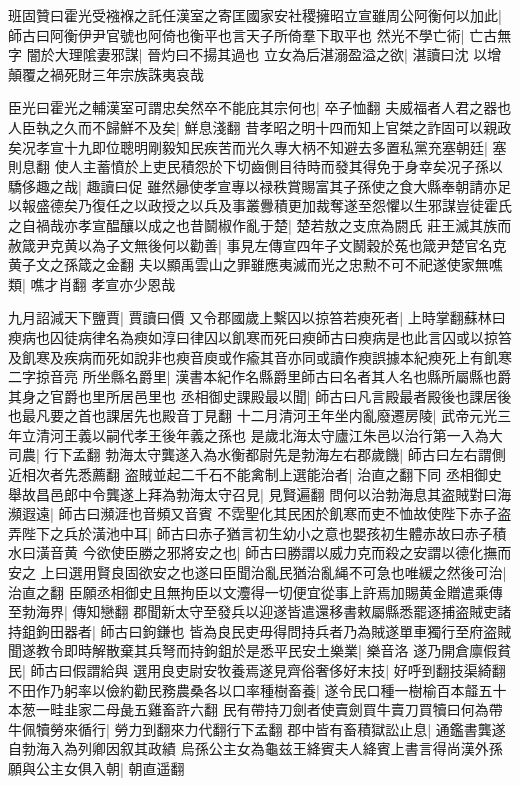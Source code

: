班固贊曰霍光受襁褓之託任漢室之寄匡國家安社稷擁昭立宣雖周公阿衡何以加此|{
	師古曰阿衡伊尹官號也阿倚也衡平也言天子所倚羣下取平也}
然光不學亡術|{
	亡古無字}
闇於大理隂妻邪謀|{
	晉灼曰不揚其過也}
立女為后湛溺盈溢之欲|{
	湛讀曰沈}
以增顛覆之禍死財三年宗族誅夷哀哉

臣光曰霍光之輔漢室可謂忠矣然卒不能庇其宗何也|{
	卒子恤翻}
夫威福者人君之器也人臣執之久而不歸鮮不及矣|{
	鮮息淺翻}
昔孝昭之明十四而知上官桀之詐固可以親政矣况孝宣十九即位聰明剛毅知民疾苦而光久專大柄不知避去多置私黨充塞朝廷|{
	塞則息翻}
使人主蓄憤於上吏民積怨於下切齒側目待時而發其得免于身幸矣况子孫以驕侈趣之哉|{
	趣讀曰促}
雖然曏使孝宣專以禄秩賞賜富其子孫使之食大縣奉朝請亦足以報盛德矣乃復任之以政授之以兵及事叢釁積更加裁奪遂至怨懼以生邪謀豈徒霍氏之自禍哉亦孝宣醖釀以成之也昔鬬椒作亂于楚|{
	楚若敖之支庶為閼氏}
莊王滅其族而赦箴尹克黄以為子文無後何以勸善|{
	事見左傳宣四年子文鬭穀於菟也箴尹楚官名克黄子文之孫箴之金翻}
夫以顯禹雲山之罪雖應夷滅而光之忠勲不可不祀遂使家無噍類|{
	噍才肖翻}
孝宣亦少恩哉

九月詔減天下鹽賈|{
	賈讀曰價}
又令郡國歲上繫囚以掠笞若瘐死者|{
	上時掌翻蘇林曰瘐病也囚徒病律名為瘐如淳曰律囚以飢寒而死曰瘐師古曰瘐病是也此言囚或以掠笞及飢寒及疾病而死如說非也瘐音庾或作瘉其音亦同或讀作瘐誤據本紀瘐死上有飢寒二字掠音亮}
所坐縣名爵里|{
	漢書本紀作名縣爵里師古曰名者其人名也縣所屬縣也爵其身之官爵也里所居邑里也}
丞相御史課殿最以聞|{
	師古曰凡言殿最者殿後也課居後也最凡要之首也課居先也殿音丁見翻}
十二月清河王年坐内亂廢遷房陵|{
	武帝元光三年立清河王義以嗣代孝王後年義之孫也}
是歲北海太守廬江朱邑以治行第一入為大司農|{
	行下孟翻}
勃海太守龔遂入為水衡都尉先是勃海左右郡歲饑|{
	師古曰左右謂側近相次者先悉薦翻}
盗賊並起二千石不能禽制上選能治者|{
	治直之翻下同}
丞相御史舉故昌邑郎中令龔遂上拜為勃海太守召見|{
	見賢遍翻}
問何以治勃海息其盗賊對曰海瀕遐遠|{
	師古曰瀕涯也音頻又音賓}
不霑聖化其民困於飢寒而吏不恤故使陛下赤子盗弄陛下之兵於潢池中耳|{
	師古曰赤子猶言初生幼小之意也嬰孩初生體赤故曰赤子積水曰潢音黄}
今欲使臣勝之邪將安之也|{
	師古曰勝謂以威力克而殺之安謂以德化撫而安之}
上曰選用賢良固欲安之也遂曰臣聞治亂民猶治亂䋲不可急也唯緩之然後可治|{
	治直之翻}
臣願丞相御史且無拘臣以文灋得一切便宜從事上許焉加賜黄金贈遣乘傳至勃海界|{
	傳知戀翻}
郡聞新太守至發兵以迎遂皆遣還移書敕屬縣悉罷逐捕盗賊吏諸持鉏鉤田器者|{
	師古曰鉤鎌也}
皆為良民吏毋得問持兵者乃為賊遂單車獨行至府盗賊聞遂教令即時解散棄其兵弩而持鉤鉏於是悉平民安土樂業|{
	樂音洛}
遂乃開倉廪假貧民|{
	師古曰假謂給與}
選用良吏尉安牧養焉遂見齊俗奢侈好末技|{
	好呼到翻技渠綺翻}
不田作乃躬率以儉約勸民務農桑各以口率種樹畜養|{
	遂令民口種一樹榆百本䪥五十本葱一畦韭家二母彘五雞畜許六翻}
民有帶持刀劍者使賣劍買牛賣刀買犢曰何為帶牛佩犢勞來循行|{
	勞力到翻來力代翻行下孟翻}
郡中皆有畜積獄訟止息|{
	通鑑書龔遂自勃海入為列卿因叙其政績}
烏孫公主女為龜兹王絳賓夫人絳賓上書言得尚漢外孫願與公主女俱入朝|{
	朝直遥翻}



